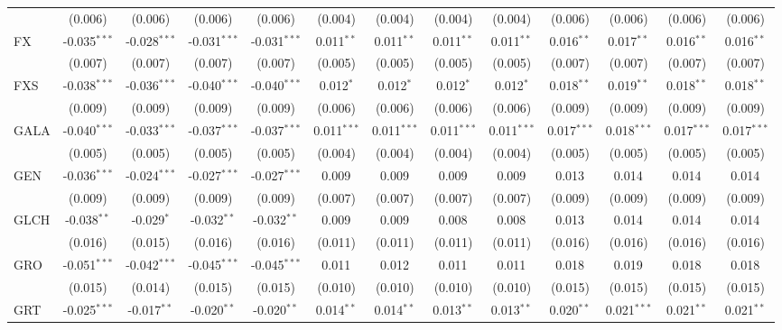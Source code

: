 \begin{table}[!htbp]
\begin{tabular}{@{\extracolsep{5pt}}lcccccccccccc}
  & (0.006) & (0.006) & (0.006) & (0.006) & (0.004) & (0.004) & (0.004) & (0.004) & (0.006) & (0.006) & (0.006) & (0.006) \\
 FX & -0.035$^{***}$ & -0.028$^{***}$ & -0.031$^{***}$ & -0.031$^{***}$ & 0.011$^{**}$ & 0.011$^{**}$ & 0.011$^{**}$ & 0.011$^{**}$ & 0.016$^{**}$ & 0.017$^{**}$ & 0.016$^{**}$ & 0.016$^{**}$ \\
  & (0.007) & (0.007) & (0.007) & (0.007) & (0.005) & (0.005) & (0.005) & (0.005) & (0.007) & (0.007) & (0.007) & (0.007) \\
 FXS & -0.038$^{***}$ & -0.036$^{***}$ & -0.040$^{***}$ & -0.040$^{***}$ & 0.012$^{*}$ & 0.012$^{*}$ & 0.012$^{*}$ & 0.012$^{*}$ & 0.018$^{**}$ & 0.019$^{**}$ & 0.018$^{**}$ & 0.018$^{**}$ \\
  & (0.009) & (0.009) & (0.009) & (0.009) & (0.006) & (0.006) & (0.006) & (0.006) & (0.009) & (0.009) & (0.009) & (0.009) \\
 GALA & -0.040$^{***}$ & -0.033$^{***}$ & -0.037$^{***}$ & -0.037$^{***}$ & 0.011$^{***}$ & 0.011$^{***}$ & 0.011$^{***}$ & 0.011$^{***}$ & 0.017$^{***}$ & 0.018$^{***}$ & 0.017$^{***}$ & 0.017$^{***}$ \\
  & (0.005) & (0.005) & (0.005) & (0.005) & (0.004) & (0.004) & (0.004) & (0.004) & (0.005) & (0.005) & (0.005) & (0.005) \\
 GEN & -0.036$^{***}$ & -0.024$^{***}$ & -0.027$^{***}$ & -0.027$^{***}$ & 0.009$^{}$ & 0.009$^{}$ & 0.009$^{}$ & 0.009$^{}$ & 0.013$^{}$ & 0.014$^{}$ & 0.014$^{}$ & 0.014$^{}$ \\
  & (0.009) & (0.009) & (0.009) & (0.009) & (0.007) & (0.007) & (0.007) & (0.007) & (0.009) & (0.009) & (0.009) & (0.009) \\
 GLCH & -0.038$^{**}$ & -0.029$^{*}$ & -0.032$^{**}$ & -0.032$^{**}$ & 0.009$^{}$ & 0.009$^{}$ & 0.008$^{}$ & 0.008$^{}$ & 0.013$^{}$ & 0.014$^{}$ & 0.014$^{}$ & 0.014$^{}$ \\
  & (0.016) & (0.015) & (0.016) & (0.016) & (0.011) & (0.011) & (0.011) & (0.011) & (0.016) & (0.016) & (0.016) & (0.016) \\
 GRO & -0.051$^{***}$ & -0.042$^{***}$ & -0.045$^{***}$ & -0.045$^{***}$ & 0.011$^{}$ & 0.012$^{}$ & 0.011$^{}$ & 0.011$^{}$ & 0.018$^{}$ & 0.019$^{}$ & 0.018$^{}$ & 0.018$^{}$ \\
  & (0.015) & (0.014) & (0.015) & (0.015) & (0.010) & (0.010) & (0.010) & (0.010) & (0.015) & (0.015) & (0.015) & (0.015) \\
 GRT & -0.025$^{***}$ & -0.017$^{**}$ & -0.020$^{**}$ & -0.020$^{**}$ & 0.014$^{**}$ & 0.014$^{**}$ & 0.013$^{**}$ & 0.013$^{**}$ & 0.020$^{**}$ & 0.021$^{***}$ & 0.021$^{**}$ & 0.021$^{**}$ \\

\end{tabular}
\end{table}
